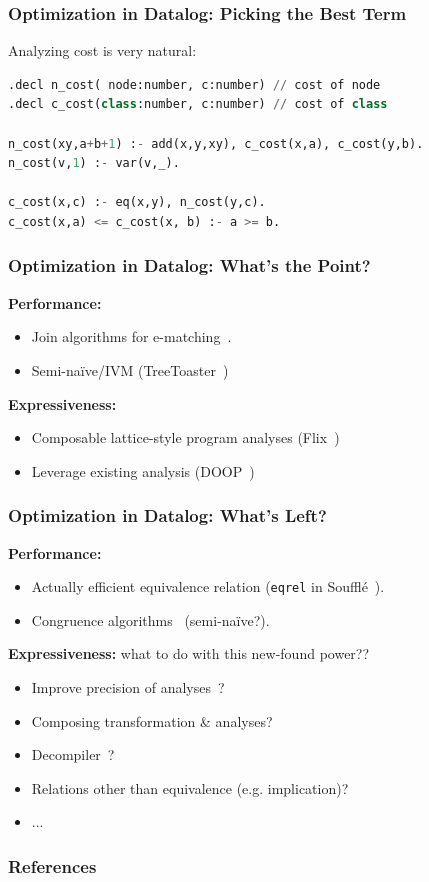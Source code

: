 \documentclass{beamer}
\begin{document}
\begin{frame}[fragile]
    \frametitle{Optimization in Datalog: Picking the Best Term}
     Analyzing cost is very natural:
     \begin{lstlisting}[language=Python]
.decl n_cost( node:number, c:number) // cost of node
.decl c_cost(class:number, c:number) // cost of class

n_cost(xy,a+b+1) :- add(x,y,xy), c_cost(x,a), c_cost(y,b).
n_cost(v,1) :- var(v,_).

c_cost(x,c) :- eq(x,y), n_cost(y,c).
c_cost(x,a) <= c_cost(x, b) :- a >= b.
    \end{lstlisting}
\end{frame}

\begin{frame}
    \frametitle{Optimization in Datalog: What's the Point?}
    \textbf{Performance:}
    \begin{itemize}
        \item Join algorithms for e-matching~\cite{ZhangWWT22}.
        \item Semi-na\"ive/IVM (TreeToaster~\cite{BalakrishnanNKZ21})
    \end{itemize}
    \pause
    \textbf{Expressiveness:}
    \begin{itemize}
        \item Composable lattice-style program analyses (Flix~\cite{MadsenYL16})
        \item Leverage existing analysis (DOOP~\cite{BravenboerS09})
    \end{itemize}
\end{frame}

\begin{frame}
    \frametitle{Optimization in Datalog: What's Left?}
    \textbf{Performance:}
    \begin{itemize}
        \item Actually efficient equivalence relation (\texttt{eqrel} in Souffl\'e~\cite{NappaZSS19}).
        \item Congruence algorithms~\cite{WillseyNWFTP21} (semi-na\"ive?).
    \end{itemize}
    \pause
    \textbf{Expressiveness:} what to do with this new-found power??
    \begin{itemize}
        \item Improve precision of analyses~\cite{Steensgaard96}?
        \item Composing transformation \& analyses\cite{LernerGC02}?
        \item Decompiler~\cite{GrechBSS19}?
        \item Relations other than equivalence (e.g. implication)?
        \item ...
    \end{itemize}
\end{frame}

\begin{frame}[allowframebreaks]
    \frametitle{References}
    
    
\end{frame}
\end{document}
